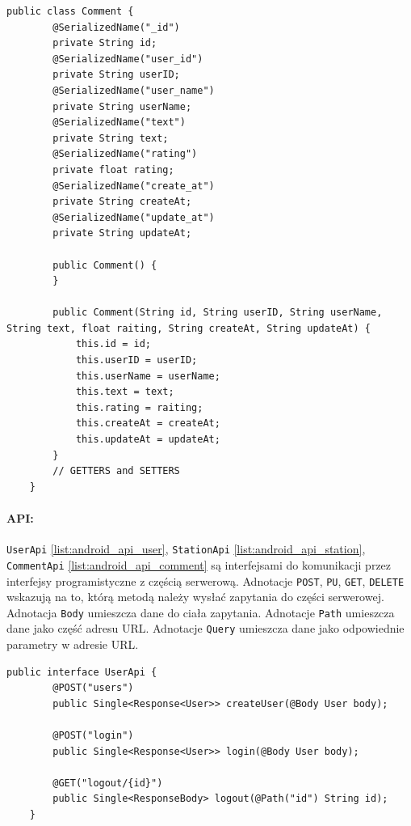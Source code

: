 \begin{lstlisting}[label=list:comment_class,caption=Plik \texttt{main/java/com/example/testapp/api/api/CommentApi.java},basicstyle=\tiny\ttfamily]
    public class Comment {
        @SerializedName("_id")
        private String id;
        @SerializedName("user_id")
        private String userID;
        @SerializedName("user_name")
        private String userName;
        @SerializedName("text")
        private String text;
        @SerializedName("rating")
        private float rating;
        @SerializedName("create_at")
        private String createAt;
        @SerializedName("update_at")
        private String updateAt;
    
        public Comment() {
        }
    
        public Comment(String id, String userID, String userName, String text, float raiting, String createAt, String updateAt) {
            this.id = id;
            this.userID = userID;
            this.userName = userName;
            this.text = text;
            this.rating = raiting;
            this.createAt = createAt;
            this.updateAt = updateAt;
        }
        // GETTERS and SETTERS
    }
\end{lstlisting}

\paragraph{API:} \texttt{UserApi} \ref{list:android_api_user}, \texttt{StationApi} \ref{list:android_api_station}, \texttt{CommentApi} \ref{list:android_api_comment} są interfejsami do komunikacji przez interfejsy programistyczne z częścią serwerową.
Adnotacje \texttt{POST}, \texttt{PU}, \texttt{GET}, \texttt{DELETE} wskazują na to, którą metodą należy wysłać zapytania do części serwerowej.
Adnotacja \texttt{Body} umieszcza dane do ciała zapytania. Adnotacje \texttt{Path} umieszcza dane jako część adresu URL. Adnotacje \texttt{Query} umieszcza dane jako odpowiednie parametry w adresie URL.

\begin{lstlisting}[label=list:android_api_user,caption=Plik \texttt{main/java/com/example/testapp/api/api/UserApi.java},basicstyle=\tiny\ttfamily]
    public interface UserApi {
        @POST("users")
        public Single<Response<User>> createUser(@Body User body);
    
        @POST("login")
        public Single<Response<User>> login(@Body User body);
    
        @GET("logout/{id}")
        public Single<ResponseBody> logout(@Path("id") String id);
    }
\end{lstlisting}

